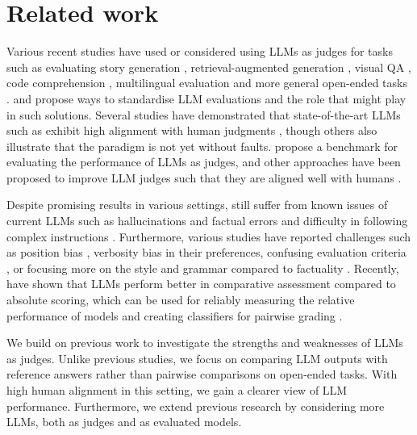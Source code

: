 \section {Related work}\label{sec:relatedwork}

Various recent studies have used or considered using LLMs as judges for tasks such as evaluating story generation \citep{chiang2023can}, retrieval-augmented generation \citep{es2023ragas},  visual QA \citep{maas2024improving}, code comprehension \citep{yuan2023evaluating}, multilingual evaluation \citep{hada2023large} and more general open-ended tasks \citep{zheng2024judging}.
\citet{Zhang2024LLMEval} and \citet{sottana2023evaluation} propose ways to standardise LLM evaluations and the role that \judgemodels might play in such solutions.
Several studies have demonstrated that state-of-the-art LLMs such as \gpt exhibit high alignment with human judgments \citep{sottana2023evaluation,zheng2024judging}, though others also illustrate that the paradigm is not yet without faults.
\citet{zeng2023evaluating} propose a benchmark for evaluating the performance of LLMs as judges, and other approaches have been proposed to improve LLM judges such that they are aligned well with humans \citep{shankar2024validates,zhu2023judgelm}.

Despite promising results in various settings, \judgemodels still suffer from known issues of current LLMs such as hallucinations and factual errors \citep{ye2023cognitive, turpin2023language} and difficulty in following complex instructions \citep{li2023instruction, he2024can}. 
Furthermore, various studies have reported challenges such as position bias \citep{pezeshkpour2023large,zheng2023large,wang2023large}, verbosity bias \citep{saito2023verbosity} in their preferences, confusing evaluation criteria \citep{hu2024llm}, or focusing more on the style and grammar compared to factuality \citep{wu2023style}.
Recently, \citet{liusie2024llm} have shown that LLMs perform better in comparative assessment compared to absolute scoring, which can be used for reliably measuring the relative performance of models \citep{liu2024aligning} and creating classifiers for pairwise grading 
\citep{llmasclassifier}.

We build on previous work to investigate the strengths and weaknesses of LLMs as judges. Unlike previous studies, we focus on comparing LLM outputs with reference answers rather than pairwise comparisons on open-ended tasks. With high human alignment in this setting, we gain a clearer view of LLM performance. Furthermore, we extend previous research by considering more LLMs, both as judges and as evaluated models.

